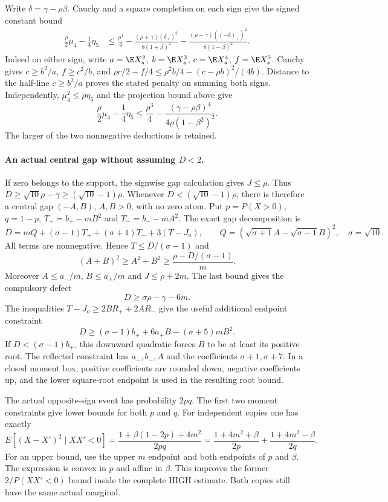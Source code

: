 Write $\delta=\gamma-\rho\beta$. Cauchy and a square completion on
each sign give the signed constant bound
\begin{align*}
 \frac\rho2\mu_4-\frac14\eta_5
 &\le\frac{\rho^3}{4}
 -\frac{(\rho+\gamma)(\delta_+)^2}{8(1+\beta)^2}
 -\frac{(\rho-\gamma)((-\delta)_+)^2}{8(1-\beta)^2}.
\end{align*}
Indeed on either sign, write $a=\E X_s^2$, $b=\E X_s^3$,
$c=\E X_s^4$, $f=\E X_s^5$. Cauchy gives $c\ge b^2/a$,
$f\ge c^2/b$, and
$\rho c/2-f/4\le\rho^2b/4-(c-\rho b)^2/(4b)$.
Distance to the half-line $c\ge b^2/a$ proves the stated penalty
on summing both signs. Independently,
$\mu_4^2\le\rho\eta_5$ and the projection bound above give
\[
 \frac\rho2\mu_4-\frac14\eta_5
 \le\frac{\rho^3}{4}
 -\frac{(\gamma-\rho\beta)^4}{4\rho(1-\beta^2)^2}.
\]
The larger of the two nonnegative deductions is retained.

\paragraph{An actual central gap without assuming \texorpdfstring{$D<2$}{D below 2}.}
If zero belongs to the support, the signwise gap calculation gives $J\le\rho$.
Thus $D\ge\sqrt{10}\rho-\gamma\ge(\sqrt{10}-1)\rho$.
Whenever $D<(\sqrt{10}-1)\rho$, there is therefore a central gap
$(-A,B)$, $A,B>0$, with no zero atom. Put $p=P(X>0)$, $q=1-p$,
$T_+=b_+-mB^2$ and $T_-=b_--mA^2$. The exact gap decomposition is
\[
 D=mQ+(\sigma-1)T_++(\sigma+1)T_-+3(T-J_o),\qquad
 Q=(\sqrt{\sigma+1}A-\sqrt{\sigma-1}B)^2,
 \quad\sigma=\sqrt{10}.
\]
All terms are nonnegative. Hence $T\le D/(\sigma-1)$ and
\[
 (A+B)^2\ge A^2+B^2\ge\frac{\rho-D/(\sigma-1)}m.
\]
Moreover $A\le a_-/m$, $B\le a_+/m$ and $J\le\rho+2m$.
The last bound gives the compulsory defect
\[
 D\ge \sigma\rho-\gamma-6m.
\]
The inequalities $T-J_o\ge2BR_++2AR_-$ give the useful additional
endpoint constraint
\[
 D\ge(\sigma-1)b_++6a_+B-(\sigma+5)mB^2.
\]
If $D<(\sigma-1)b_+$, this downward quadratic forces $B$ to be at
least its positive root. The reflected constraint has $a_-,b_-,A$
and the coefficients $\sigma+1,\sigma+7$. In a closed moment box,
positive coefficients are rounded down, negative coefficients up, and
the lower square-root endpoint is used in the resulting root bound.

The actual opposite-sign event has probability $2pq$.
The first two moment constraints give lower bounds for both $p$ and $q$.
For independent copies one has exactly
\[
 E[(X-X')^2\mid XX'<0]
 =\frac{1+\beta(1-2p)+4m^2}{2pq}
 =\frac{1+4m^2+\beta}{2p}
  +\frac{1+4m^2-\beta}{2q}.
\]
For an upper bound, use the upper $m$ endpoint and both endpoints of
$p$ and $\beta$. The expression is convex in $p$ and affine in $\beta$.
This improves the former $2/P(XX'<0)$ bound inside the complete HIGH
estimate. Both copies still have the same actual marginal.

